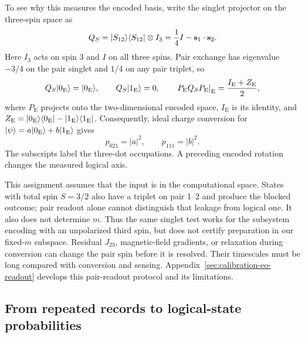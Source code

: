 To see why this measures the encoded basis, write the singlet
projector on the three-spin space as
\begin{equation}
  Q_S=\ket{S_{12}}\bra{S_{12}}\otimes I_3
       =\frac14 I-\mathbf{s}_1\cdot\mathbf{s}_2.
  \label{eq:eo-readout-projector}
\end{equation}
Here $I_3$ acts on spin 3 and $I$ on all three spins.
Pair exchange has eigenvalue $-3/4$ on the pair singlet and $1/4$
on any pair triplet, so
\begin{equation}
  Q_S\ket{0_{\mathrm E}}=\ket{0_{\mathrm E}},\qquad
  Q_S\ket{1_{\mathrm E}}=0,\qquad
  \left.P_{\mathrm E}Q_SP_{\mathrm E}\right|_{\mathrm E}
        =\frac{I_{\mathrm E}+Z_{\mathrm E}}{2},
  \label{eq:eo-logical-readout}
\end{equation}
where $P_{\mathrm E}$ projects onto the two-dimensional encoded
space, $I_{\mathrm E}$ is its identity, and
$Z_{\mathrm E}=\lvert 0_{\mathrm E}\rangle\langle 0_{\mathrm E}\rvert
-\lvert 1_{\mathrm E}\rangle\langle 1_{\mathrm E}\rvert$.
Consequently, ideal charge conversion for
$\lvert \psi\rangle=a\lvert 0_{\mathrm E}\rangle+b\lvert 1_{\mathrm E}\rangle$ gives
\begin{equation}
  p_{021}=|a|^2,\qquad p_{111}=|b|^2.
  \label{eq:eo-readout-probabilities}
\end{equation}
The subscripts label the three-dot occupations.
A preceding encoded rotation changes the measured logical axis.

This assignment assumes that the input is in the computational
space. States with total spin $S=3/2$ also have a triplet on pair
1--2 and produce the blocked outcome; pair readout alone cannot
distinguish that leakage from logical one.
It also does not determine $m$. Thus the same singlet test works
for the subsystem encoding with an unpolarized third spin, but
does not certify preparation in our fixed-$m$ subspace.
Residual $J_{23}$, magnetic-field gradients, or relaxation during
conversion can change the pair spin before it is resolved.
Their timescales must be long compared with conversion and sensing.
Appendix~\ref{sec:calibration-eo-readout} develops this pair-readout
protocol and its limitations.

\subsection{From repeated records to logical-state probabilities}
\label{sec:platform-readout-probabilities}

